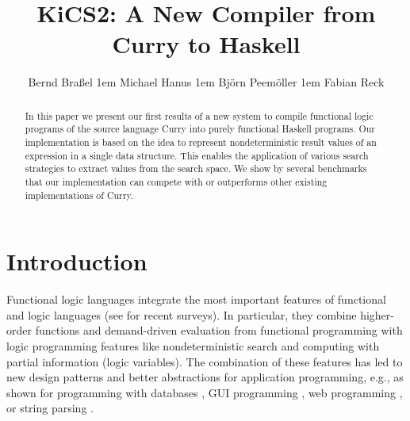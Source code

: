 \documentclass{llncs}
\begin{document}
\pagestyle{plain}
\sloppy

\title{KiCS2: A New Compiler from Curry to Haskell}

\author{
Bernd Bra{\ss}el
\kern1em
Michael Hanus
\kern1em
Bj{\"o}rn Peem{\"o}ller
\kern1em
Fabian Reck
}

\maketitle

\begin{abstract}
In this paper we present our first results of a new system
to compile functional logic programs of the source language Curry
into purely functional Haskell programs.
Our implementation is based on the idea to represent
nondeterministic result values of an expression in a single data structure.
This enables the application of various search strategies
to extract values from the search space.
We show by several benchmarks that our implementation
can compete with or outperforms other existing implementations of Curry.
\end{abstract}


\section{Introduction}
\label{sec:Introduction}

Functional logic languages integrate the most important
features of functional and logic languages
(see \cite{AntoyHanus10CACM,Hanus07ICLP} for recent surveys).
In particular, they combine higher-order functions and demand-driven
evaluation from functional programming with logic programming features
like nondeterministic search and computing with partial information
(logic variables).
The combination of these features
has led to new design patterns \cite{AntoyHanus02FLOPS}
and better abstractions for application programming,
e.g., as shown for programming with databases
\cite{BrasselHanusMueller08PADL,Fischer05},
GUI programming \cite{Hanus00PADL},
web programming \cite{Hanus01PADL,Hanus06PPDP,HanusKoschnicke10PADL},
or string parsing \cite{CaballeroLopez99}.
\end{document}
